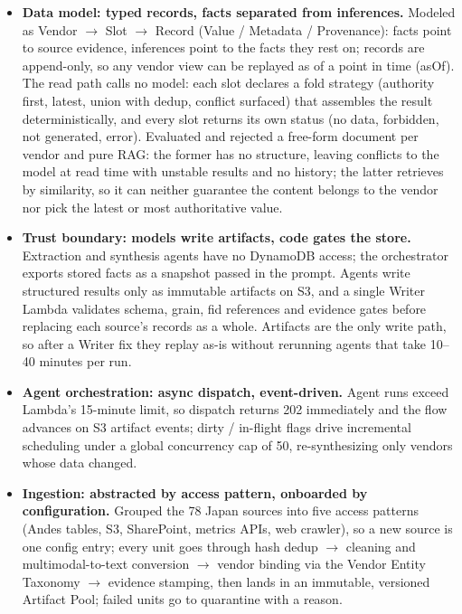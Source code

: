 \documentclass{resume}
\begin{document}
\begin{itemize}
    \item \textbf{Data model: typed records, facts separated from inferences.} Modeled as Vendor $\rightarrow$ Slot $\rightarrow$ Record (Value / Metadata / Provenance): facts point to source evidence, inferences point to the facts they rest on; records are append-only, so any vendor view can be replayed as of a point in time (asOf). The read path calls no model: each slot declares a fold strategy (authority first, latest, union with dedup, conflict surfaced) that assembles the result deterministically, and every slot returns its own status (no data, forbidden, not generated, error). Evaluated and rejected a free-form document per vendor and pure RAG: the former has no structure, leaving conflicts to the model at read time with unstable results and no history; the latter retrieves by similarity, so it can neither guarantee the content belongs to the vendor nor pick the latest or most authoritative value.
    \item \textbf{Trust boundary: models write artifacts, code gates the store.} Extraction and synthesis agents have no DynamoDB access; the orchestrator exports stored facts as a snapshot passed in the prompt. Agents write structured results only as immutable artifacts on S3, and a single Writer Lambda validates schema, grain, fid references and evidence gates before replacing each source's records as a whole. Artifacts are the only write path, so after a Writer fix they replay as-is without rerunning agents that take 10--40 minutes per run.
    \item \textbf{Agent orchestration: async dispatch, event-driven.} Agent runs exceed Lambda's 15-minute limit, so dispatch returns 202 immediately and the flow advances on S3 artifact events; dirty / in-flight flags drive incremental scheduling under a global concurrency cap of 50, re-synthesizing only vendors whose data changed.
    \item \textbf{Ingestion: abstracted by access pattern, onboarded by configuration.} Grouped the 78 Japan sources into five access patterns (Andes tables, S3, SharePoint, metrics APIs, web crawler), so a new source is one config entry; every unit goes through hash dedup $\rightarrow$ cleaning and multimodal-to-text conversion $\rightarrow$ vendor binding via the Vendor Entity Taxonomy $\rightarrow$ evidence stamping, then lands in an immutable, versioned Artifact Pool; failed units go to quarantine with a reason.

\end{itemize}
\end{document}
